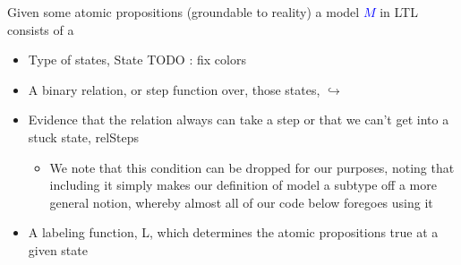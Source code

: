\documentclass{article}
\newcommand{\blue}[1]{\textcolor{blue}{#1}}
\newcommand{\pink}[1]{\textcolor{hotmagenta}{#1}}
\begin{document}
Given some atomic propositions (groundable to reality) a model \blue{$M$} in LTL consists
of a

\begin{itemize}
\item Type of states, \pink{State} TODO : fix colors
\item A binary relation, or step function over, those states, \pink{$\hookrightarrow$}
\item Evidence that the relation always can take a step or that we can't get into a stuck state, \pink{relSteps}
\begin{itemize}
\item We note that this condition can be dropped for our purposes, noting that including it simply makes our definition of model a subtype off a more general notion, whereby almost all of our code below foregoes using it
\end{itemize}
\item A labeling function, L, which determines the atomic propositions true at a given state
\end{itemize}

\begin{code}%
\>[0]\AgdaSpace{}%
\AgdaSpace{}%
\AgdaSymbol{(}\AgdaSpace{}%
\AgdaSymbol{:}\AgdaSpace{}%
\AgdaSymbol{)}\AgdaSpace{}%
\AgdaSymbol{:}\AgdaSpace{}%
\AgdaSpace{}%
\<%
\\
\>[0][@{}l@{\AgdaIndent{0}}]%
\>[2]\<%
\\
\>[2][@{}l@{\AgdaIndent{0}}]%
\>[4]\AgdaSpace{}%
\AgdaSymbol{:}\AgdaSpace{}%
\<%
\\
%
\>[4]\AgdaSpace{}%
\AgdaSymbol{:}\AgdaSpace{}%
\AgdaSpace{}%
\<%
\\
%
\>[4]\AgdaSpace{}%
\AgdaSymbol{:}\AgdaSpace{}%
\AgdaSpace{}%
\<%
\\
%
\>[4]\<%
\\
%
\>[4]\AgdaSpace{}%
\AgdaSymbol{:}\AgdaSpace{}%
\AgdaSpace{}%
\AgdaSpace{}%
\AgdaSpace{}%
\AgdaSpace{}%
\<%
\end{code}
\end{document}
